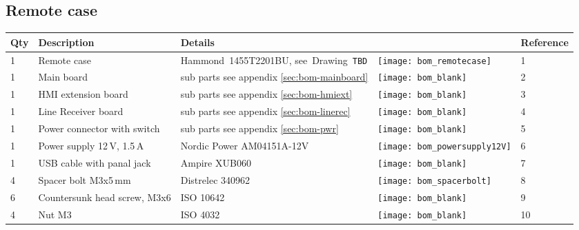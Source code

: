 \subsection{Remote case}
\label{sec:bom-remotecase}

\begin{tabular}{m{0.5cm} m{5cm} m{5cm} m{1cm} m{1.5cm}}
\bfseries Qty  & \bfseries Description              & \bfseries Details                                 &                                          & \bfseries Reference\\
\hline
1    & Remote case                                  & \mbox{Hammond 1455T2201BU}, \mbox{see Drawing \texttt{TBD}} & \texttt{[image: bom\_remotecase]} & 1    \\
\hline
1    & Main board                                   & sub parts see appendix \ref{sec:bom-mainboard}    & \texttt{[image: bom\_blank]}   & 2   \\
\hline
1    & HMI extension board                          & sub parts see appendix \ref{sec:bom-hmiext}       & \texttt{[image: bom\_blank]}   & 3   \\
\hline
1    & Line Receiver board                          & sub parts see appendix \ref{sec:bom-linerec}      & \texttt{[image: bom\_blank]}   & 4    \\
\hline
1    & Power connector with switch                  & sub parts see appendix \ref{sec:bom-pwr}       & \texttt{[image: bom\_blank]}   & 5   \\
\hline
1    & Power supply 12\,V, 1.5\,A                   & Nordic Power AM04151A-12V                         & \texttt{[image: bom\_powersupply12V]} & 6   \\
\hline
1    & USB cable with panal jack                    & Ampire XUB060                                     & \texttt{[image: bom\_blank]} & 7   \\
\hline
4    & Spacer bolt M3x5\,mm                         & Distrelec 340962                                  & \texttt{[image: bom\_spacerbolt]} & 8   \\
\hline
6    & Countersunk head screw, M3x6                 & ISO 10642                                         & \texttt{[image: bom\_blank]}   & 9   \\
\hline
4    & Nut M3                                       & ISO 4032                                          & \texttt{[image: bom\_blank]}   & 10   \\

\end{tabular}
